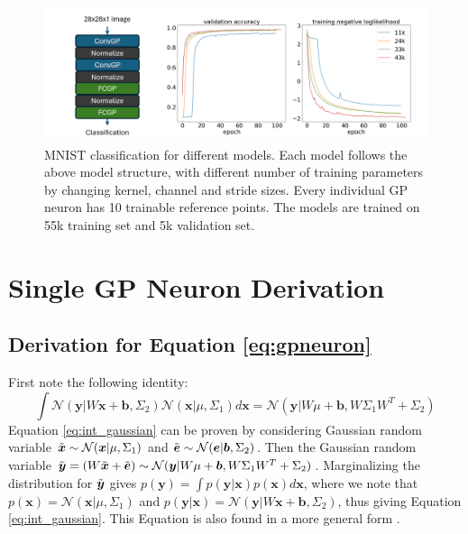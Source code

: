 \documentclass{article}
\begin{document}
\begin{figure}[t]
    \centering
    \includegraphics[width=0.9\columnwidth]{MNIST_model.png}
    \caption{MNIST classification for different models. Each model follows the above model structure, with different number of training parameters by changing kernel, channel and stride sizes. Every individual GP neuron has 10 trainable reference points. The models are trained on 55k training set and 5k validation set.}
    \label{fig:MNIST_model}
\end{figure}





\newpage
\appendix

\section{Single GP Neuron Derivation}
\label{apd:singleGPNeuron}
\subsection{Derivation for Equation \ref{eq:gpneuron}}

First note the following identity:
\begin{equation}
    \int\mathcal{N}(\boldsymbol{y}|W\boldsymbol{x}+\boldsymbol{b},\Sigma_2)\mathcal{N}(\boldsymbol{x}|\mu,\Sigma_1)d\boldsymbol{x}=\mathcal{N}(\boldsymbol{y}|W\mu+\boldsymbol{b},W\Sigma_1W^T+\Sigma_2)
    \label{eq:int_gaussian}
\end{equation}
Equation \ref{eq:int_gaussian} can be proven by considering Gaussian random variable $\Tilde{\boldsymbol{x}}\sim\mathcal{N}(\boldsymbol{x}|\mu,\Sigma_1)$ and $\Tilde{\boldsymbol{e}}\sim\mathcal{N}(\boldsymbol{e}|\boldsymbol{b},\Sigma_2)$. Then the Gaussian random variable $\Tilde{\boldsymbol{y}}=(W\Tilde{\boldsymbol{x}}+\Tilde{\boldsymbol{e}})\sim\mathcal{N}(\boldsymbol{y}|W\mu+\boldsymbol{b},W\Sigma_1W^T+\Sigma_2)$. Marginalizing the distribution for $\Tilde{\boldsymbol{y}}$ gives $p(\boldsymbol{y})=\int p(\boldsymbol{y}|\boldsymbol{x})p(\boldsymbol{x})d\boldsymbol{x}$, where we note that $p(\boldsymbol{x})=\mathcal{N}(\boldsymbol{x}|\mu,\Sigma_1)$ and $p(\boldsymbol{y}|\boldsymbol{x})=\mathcal{N}(\boldsymbol{y}|W\boldsymbol{x}+\boldsymbol{b},\Sigma_2)$, thus giving Equation \ref{eq:int_gaussian}. This Equation is also found in a more general form \cite{MatrixCookBook}.
\end{document}
